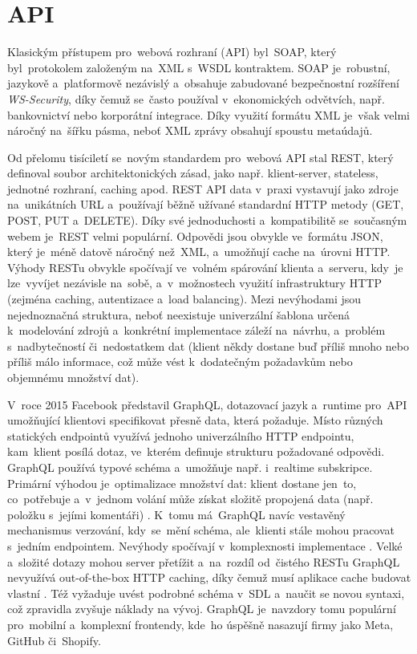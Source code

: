 \section{API}
\label{sec:research-api}

Klasickým přístupem pro~webová rozhraní (API) byl~SOAP, který byl~protokolem
založeným na~XML s~WSDL kontraktem. SOAP je~robustní, jazykově a~platformově
nezávislý a~obsahuje zabudované bezpečnostní rozšíření \emph{WS-Security},
díky čemuž se~často používal v~ekonomických odvětvích, např. bankovnictví
nebo korporátní integrace. Díky využití formátu XML je~však velmi náročný
na~šířku pásma, neboť XML zprávy obsahují spoustu metaúdajů.
\cite{YHVfLHsNlUItkF6G,Sj7FFY7SXnJ6m41T} %

Od přelomu tisíciletí se~novým standardem pro~webová API stal REST, který
definoval soubor architektonických zásad, jako např. klient-server, stateless,
jednotné rozhraní, caching apod. REST API data v~praxi vystavují jako zdroje
na~unikátních URL a~používají běžně užívané standardní HTTP metody (GET, POST,
PUT a~DELETE). Díky své jednoduchosti a~kompatibilitě se~současným webem
je~REST velmi populární. Odpovědi jsou obvykle ve~formátu JSON, který je~méně
datově náročný než~XML, a~umožňují cache na~úrovni HTTP. Výhody RESTu obvykle
spočívají ve~volném spárování klienta a~serveru, kdy~je lze~vyvíjet nezávisle
na~sobě, a~v~možnostech využití infrastruktury HTTP (zejména caching,
autentizace a~load balancing). Mezi nevýhodami jsou nejednoznačná struktura,
neboť neexistuje univerzální šablona určená k~modelování zdrojů a~konkrétní
implementace záleží na~návrhu, a~problém s~nadbytečností či~nedostatkem dat
(klient někdy dostane buď příliš mnoho nebo příliš málo informace,
což může vést k~dodatečným požadavkům nebo objemnému množství dat).
\cite{YHVfLHsNlUItkF6G,Sj7FFY7SXnJ6m41T} %

V~roce 2015 Facebook představil GraphQL, dotazovací jazyk a~runtime pro~API
umožňující klientovi specifikovat přesně data, která požaduje. Místo různých
statických endpointů využívá jednoho univerzálního HTTP endpointu, kam~klient
posílá dotaz, ve~kterém definuje strukturu požadované odpovědi. GraphQL
používá typové schéma a~umožňuje např. i~realtime subskripce. Primární výhodou
je~optimalizace množství dat: klient dostane jen~to, co~potřebuje a~v~jednom
volání může získat složitě propojená data (např. položku s~jejími komentáři)
\cite{YHVfLHsNlUItkF6G,Sj7FFY7SXnJ6m41T}. %
K~tomu má~GraphQL navíc vestavěný mechanismus verzování, kdy~se~mění schéma,
ale~klienti stále mohou pracovat s~jedním endpointem.
Nevýhody spočívají v~komplexnosti implementace
\cite{YHVfLHsNlUItkF6G,Sj7FFY7SXnJ6m41T}. %
Velké a~složité dotazy mohou server přetížit a~na~rozdíl od~čistého RESTu
GraphQL nevyužívá out-of-the-box HTTP caching, díky čemuž musí aplikace cache
budovat vlastní \cite{YHVfLHsNlUItkF6G,Sj7FFY7SXnJ6m41T}. %
Též vyžaduje uvést podrobné schéma v~SDL a~naučit se novou syntaxi,
což zpravidla zvyšuje náklady na vývoj. GraphQL je~navzdory tomu populární
pro~mobilní a~komplexní frontendy, kde~ho úspěšně nasazují firmy jako Meta,
GitHub či~Shopify.

